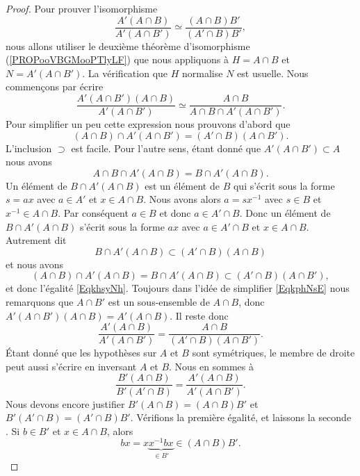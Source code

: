 \begin{proof}
	Pour prouver l'isomorphisme
	\begin{equation}
		\frac{ A'(A\cap B) }{ A'(A\cap B') } \simeq \frac{ (A\cap B)B' }{ (A'\cap B)B' },
	\end{equation}
	nous allons utiliser le deuxième théorème d'isomorphisme (\ref{PROPooVBGMooPTlyLF}) que nous appliquons à \( H=A\cap B\) et \( N=A'(A\cap B')\). La vérification que \( H\) normalise \( N\) est usuelle. Nous commençons par écrire
	\begin{equation}    \label{EqkphNsE}
		\frac{ A'(A\cap B')(A\cap B) }{ A'(A\cap B') }\simeq\frac{ A\cap B }{ A\cap B\cap A'(A\cap B') }.
	\end{equation}
	Pour simplifier un peu cette expression nous prouvons d'abord que
	\begin{equation}    \label{EqkhsyNh}
		(A\cap B)\cap A'(A\cap B')=(A'\cap B)(A\cap B').
	\end{equation}
	L'inclusion \( \supset\) est facile. Pour l'autre sens, étant donné que \( A'(A\cap B')\subset A\) nous avons
	\begin{equation}        \label{EQooEEVIooHCbasF}
		A\cap B\cap A'(A\cap B)=B\cap A'(A\cap B).
	\end{equation}
	Un élément de \( B\cap A'(A\cap B)\) est un élément de \( B\) qui s'écrit sous la forme \( s=ax\) avec \( a\in A'\) et \( x\in A\cap B\). Nous avons alors \( a=sx^{-1}\) avec \( s\in B\) et \( x^{-1} \in A\cap B\). Par conséquent \( a\in B\) et donc \( a\in A'\cap B\). Donc un élément de \( B\cap A'(A\cap B)\) s'écrit sous la forme \( ax\) avec \( a\in A'\cap B\) et \( x\in A\cap B\). Autrement dit
	\begin{equation}
		B\cap A'(A\cap B)\subset (A'\cap B)(A\cap B)
	\end{equation}
	et nous avons
	\begin{equation}
		(A\cap B)\cap A'(A\cap B)=B\cap A'(A\cap B)\subset (A'\cap B)(A\cap B'),
	\end{equation}
	et donc l'égalité \eqref{EqkhsyNh}. Toujours dans l'idée de simplifier \eqref{EqkphNsE} nous remarquons que \( A\cap B'\) est un sous-ensemble de \( A\cap B\), donc \( A'(A\cap B')(A\cap B)=A'(A\cap B)\). Il reste donc
	\begin{equation}
		\frac{ A'(A\cap B) }{ A'(A\cap B') }=\frac{ A\cap B }{ (A'\cap B)(A\cap B') }.
	\end{equation}
	Étant donné que les hypothèses sur \( A\) et \( B\) sont symétriques, le membre de droite peut aussi s'écrire en inversant \( A\) et \( B\). Nous en sommes à
	\begin{equation}
		\frac{ B'(A\cap B) }{ B'(A'\cap B) }=\frac{ A'(A\cap B) }{ A'(A\cap B') }.
	\end{equation}
	Nous devons encore justifier \( B'(A\cap B)=(A\cap B)B'\) et \( B'(A'\cap B)=(A'\cap B)B'\). Vérifions la première égalité, et laissons la seconde \href{https://abstrusegoose.com/395}{}.
	Si \( b\in B'\) et \( x\in A\cap B\), alors
	\begin{equation}
		bx=x\underbrace{x^{-1}bx}_{\in B'}\in (A\cap B)B'.
	\end{equation}
\end{proof}

